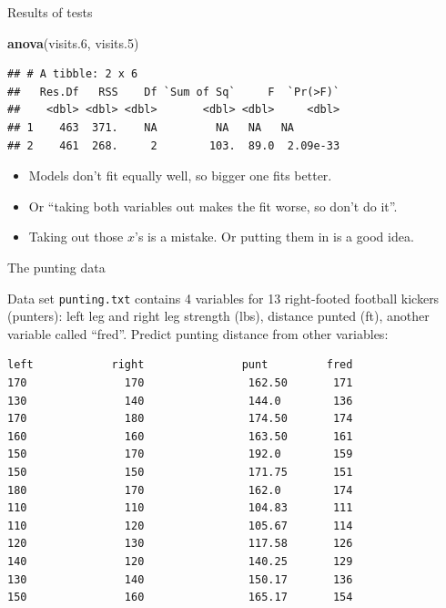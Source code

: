 \documentclass[
  ignorenonframetext,
]{beamer}
\newenvironment{Shaded}{\begin{snugshade}}{\end{snugshade}}
\newcommand{\FloatTok}[1]{\textcolor[rgb]{0.00,0.00,0.81}{#1}}
\newcommand{\KeywordTok}[1]{\textcolor[rgb]{0.13,0.29,0.53}{\textbf{#1}}}
\newcommand{\NormalTok}[1]{#1}
\begin{document}
\begin{frame}[fragile]{Results of tests}
\protect\hypertarget{results-of-tests}{}

\begin{Shaded}
\begin{Highlighting}[]
\KeywordTok{anova}\NormalTok{(visits}\FloatTok{.6}\NormalTok{, visits}\FloatTok{.5}\NormalTok{)}
\end{Highlighting}
\end{Shaded}

\begin{verbatim}
## # A tibble: 2 x 6
##   Res.Df   RSS    Df `Sum of Sq`     F  `Pr(>F)`
##    <dbl> <dbl> <dbl>       <dbl> <dbl>     <dbl>
## 1    463  371.    NA         NA   NA   NA       
## 2    461  268.     2        103.  89.0  2.09e-33
\end{verbatim}

\begin{itemize}
\item
  Models don't fit equally well, so bigger one fits better.
\item
  Or ``taking both variables out makes the fit worse, so don't do it''.
\item
  Taking out those \(x\)'s is a mistake. Or putting them in is a good
  idea.
\end{itemize}

\end{frame}

\begin{frame}[fragile]{The punting data}
\protect\hypertarget{the-punting-data}{}

Data set \texttt{punting.txt} contains 4 variables for 13 right-footed
football kickers (punters): left leg and right leg strength (lbs),
distance punted (ft), another variable called ``fred''. Predict punting
distance from other variables:

\scriptsize

\begin{verbatim}
left            right               punt         fred
170               170                162.50       171 
130               140                144.0        136   
170               180                174.50       174 
160               160                163.50       161 
150               170                192.0        159 
150               150                171.75       151 
180               170                162.0        174 
110               110                104.83       111 
110               120                105.67       114 
120               130                117.58       126 
140               120                140.25       129  
130               140                150.17       136 
150               160                165.17       154 
\end{verbatim}

\normalsize

\end{frame}
\end{document}
